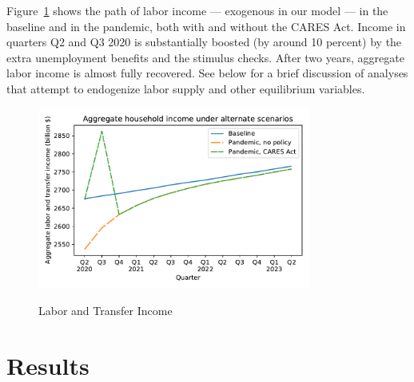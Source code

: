 \documentclass[titlepage,letterpaper]{\econtex}
\begin{document}
\hypertarget{labor-income}{}
Figure~\ref{labor_income} shows the path of labor income --- exogenous in our model --- in the baseline and in the pandemic, both with and without the CARES Act.
Income in quarters Q2 and Q3 2020 is substantially boosted (by around 10 percent) by the extra unemployment benefits and the stimulus checks.
After two years, aggregate labor income is almost fully recovered.  See below for a brief discussion of analyses that attempt to endogenize labor supply and other equilibrium variables.

\begin{figure}
  \centering
  \caption{Labor and Transfer Income}
  \label{labor_income}
  { \includegraphics[width=0.8\textwidth]{./Figures/AggLT}}
\end{figure}


\hypertarget{Results}{}
\section{Results}
\end{document}
